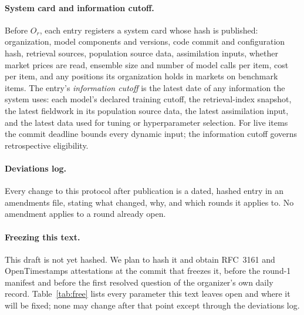 \documentclass[11pt]{article}
\begin{document}
\paragraph{System card and information cutoff.} Before $O_r$, each entry registers a system card whose hash is published: organization, model components and versions, code commit and configuration hash, retrieval sources, population source data, assimilation inputs, whether market prices are read, ensemble size and number of model calls per item, cost per item, and any positions its organization holds in markets on benchmark items. The entry's \emph{information cutoff} is the latest date of any information the system uses: each model's declared training cutoff, the retrieval-index snapshot, the latest fieldwork in its population source data, the latest assimilation input, and the latest data used for tuning or hyperparameter selection. For live items the commit deadline bounds every dynamic input; the information cutoff governs retrospective eligibility.

\paragraph{Deviations log.} Every change to this protocol after publication is a dated, hashed entry in an amendments file, stating what changed, why, and which rounds it applies to. No amendment applies to a round already open.

\paragraph{Freezing this text.} This draft is not yet hashed. We plan to hash it and obtain RFC~3161 and OpenTimestamps attestations at the commit that freezes it, before the round-1 manifest and before the first resolved question of the organizer's own daily record. Table~\ref{tab:free} lists every parameter this text leaves open and where it will be fixed; none may change after that point except through the deviations log.
\end{document}
